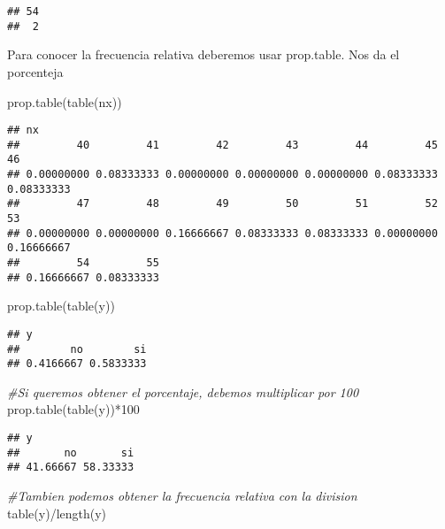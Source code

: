\documentclass[
]{article}
\newenvironment{Shaded}{\begin{snugshade}}{\end{snugshade}}
\newcommand{\CommentTok}[1]{\textcolor[rgb]{0.56,0.35,0.01}{\textit{#1}}}
\newcommand{\DecValTok}[1]{\textcolor[rgb]{0.00,0.00,0.81}{#1}}
\newcommand{\FunctionTok}[1]{\textcolor[rgb]{0.00,0.00,0.00}{#1}}
\newcommand{\NormalTok}[1]{#1}
\newcommand{\SpecialCharTok}[1]{\textcolor[rgb]{0.00,0.00,0.00}{#1}}
\begin{document}
\begin{verbatim}
## 54 
##  2
\end{verbatim}

Para conocer la frecuencia relativa deberemos usar prop.table. Nos da el
porcenteja

\begin{Shaded}
\begin{Highlighting}[]
\FunctionTok{prop.table}\NormalTok{(}\FunctionTok{table}\NormalTok{(nx))}
\end{Highlighting}
\end{Shaded}

\begin{verbatim}
## nx
##         40         41         42         43         44         45         46 
## 0.00000000 0.08333333 0.00000000 0.00000000 0.00000000 0.08333333 0.08333333 
##         47         48         49         50         51         52         53 
## 0.00000000 0.00000000 0.16666667 0.08333333 0.08333333 0.00000000 0.16666667 
##         54         55 
## 0.16666667 0.08333333
\end{verbatim}

\begin{Shaded}
\begin{Highlighting}[]
\FunctionTok{prop.table}\NormalTok{(}\FunctionTok{table}\NormalTok{(y))}
\end{Highlighting}
\end{Shaded}

\begin{verbatim}
## y
##        no        si 
## 0.4166667 0.5833333
\end{verbatim}

\begin{Shaded}
\begin{Highlighting}[]
\CommentTok{\#Si queremos obtener el porcentaje, debemos multiplicar por 100}
\FunctionTok{prop.table}\NormalTok{(}\FunctionTok{table}\NormalTok{(y))}\SpecialCharTok{*}\DecValTok{100}
\end{Highlighting}
\end{Shaded}

\begin{verbatim}
## y
##       no       si 
## 41.66667 58.33333
\end{verbatim}

\begin{Shaded}
\begin{Highlighting}[]
\CommentTok{\#Tambien podemos obtener la frecuencia relativa con la division}
\FunctionTok{table}\NormalTok{(y)}\SpecialCharTok{/}\FunctionTok{length}\NormalTok{(y)}
\end{Highlighting}
\end{Shaded}
\end{document}
